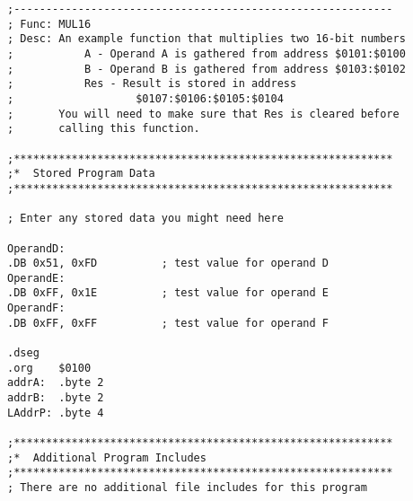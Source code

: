 \documentclass[12pt,letterpaper]{article}
\begin{document}
\begin{verbatim}
;-----------------------------------------------------------
; Func: MUL16
; Desc: An example function that multiplies two 16-bit numbers
;			A - Operand A is gathered from address $0101:$0100
;			B - Operand B is gathered from address $0103:$0102
;			Res - Result is stored in address 
;					$0107:$0106:$0105:$0104
;		You will need to make sure that Res is cleared before
;		calling this function.

;***********************************************************
;*	Stored Program Data
;***********************************************************

; Enter any stored data you might need here

OperandD:
.DB	0x51, 0xFD			; test value for operand D
OperandE:
.DB	0xFF, 0x1E			; test value for operand E
OperandF:
.DB	0xFF, 0xFF			; test value for operand F

.dseg
.org	$0100
addrA:	.byte 2
addrB:	.byte 2
LAddrP:	.byte 4

;***********************************************************
;*	Additional Program Includes
;***********************************************************
; There are no additional file includes for this program
\end{verbatim}
\end{document}
